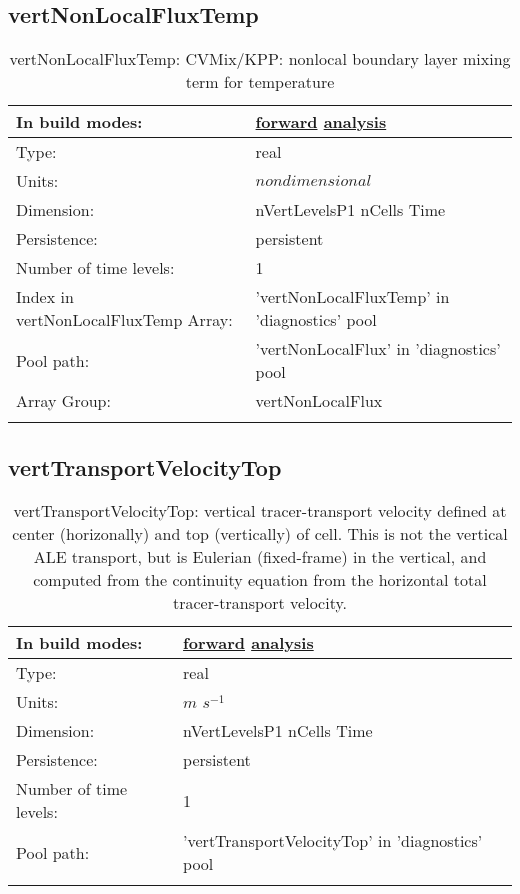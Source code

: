 \subsection[vertNonLocalFluxTemp]{vertNonLocalFluxTemp}
\label{subsec:var_sec_diagnostics_vertNonLocalFluxTemp}
\begin{center}
\begin{longtable}{| p{2.0in} | p{4.0in} |}
        \hline 
        In build modes: & \hyperref[subsec:forward_var_tab_diagnostics]{forward} \hyperref[subsec:analysis_var_tab_diagnostics]{analysis} \\
        \hline 
        Type: & real \\
        \hline 
        Units: & $nondimensional$ \\
        \hline 
        Dimension: & nVertLevelsP1 nCells Time \\
        \hline 
        Persistence: & persistent \\
        \hline 
        Number of time levels: & 1 \\
        \hline 
		 Index in vertNonLocalFluxTemp Array: & 'vertNonLocalFluxTemp' in 'diagnostics' pool \\
		 \hline 
            Pool path: & 'vertNonLocalFlux' in 'diagnostics' pool
 \\
		 \hline 
		 Array Group: & vertNonLocalFlux \\
		 \hline 
    \caption{vertNonLocalFluxTemp: CVMix/KPP: nonlocal boundary layer mixing term for temperature}
\end{longtable}
\end{center}
\subsection[vertTransportVelocityTop]{vertTransportVelocityTop}
\label{subsec:var_sec_diagnostics_vertTransportVelocityTop}
\begin{center}
\begin{longtable}{| p{2.0in} | p{4.0in} |}
        \hline 
        In build modes: & \hyperref[subsec:forward_var_tab_diagnostics]{forward} \hyperref[subsec:analysis_var_tab_diagnostics]{analysis} \\
        \hline 
        Type: & real \\
        \hline 
        Units: & $m$ $s^{-1}$ \\
        \hline 
        Dimension: & nVertLevelsP1 nCells Time \\
        \hline 
        Persistence: & persistent \\
        \hline 
        Number of time levels: & 1 \\
        \hline 
            Pool path: & 'vertTransportVelocityTop' in 'diagnostics' pool
 \\
		 \hline 
    \caption{vertTransportVelocityTop: vertical tracer-transport velocity defined at center (horizonally) and top (vertically) of cell.  This is not the vertical ALE transport, but is Eulerian (fixed-frame) in the vertical, and computed from the continuity equation from the horizontal total tracer-transport velocity.}
\end{longtable}
\end{center}
